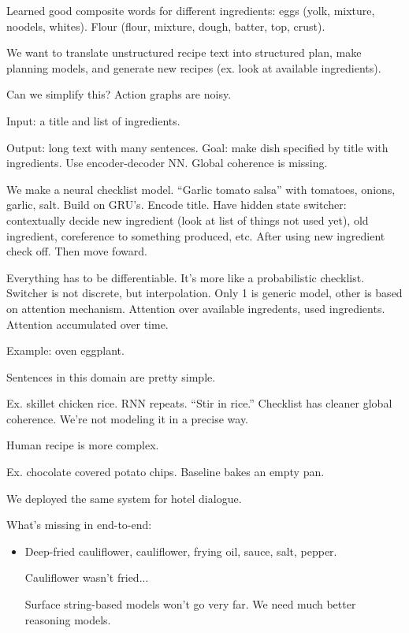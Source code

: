 Learned good composite words for different ingredients: eggs (yolk, mixture, noodels, whites). Flour (flour, mixture, dough, batter, top, crust). 

We want to translate unstructured recipe text into structured plan, make planning models, and generate new recipes (ex. look at available ingredients).

Can we simplify this? Action graphs are noisy.

Input: a title and list of ingredients.

Output: long text with many sentences. Goal: make dish specified by title with ingredients. Use encoder-decoder NN. 
Global coherence is missing.



We make a neural checklist model. ``Garlic tomato salsa'' with tomatoes, onions, garlic, salt. Build on GRU's. Encode title. Have hidden state switcher: contextually decide new ingredient (look at list of things not used yet), old ingredient, coreference to something produced, etc. After using new ingredient check off. Then move foward. 

Everything has to be differentiable. 
It's more like a probabilistic checklist.  Switcher is not discrete, but interpolation.
Only 1 is generic model, other is based on attention mechanism. Attention over available ingredents, used ingredients. Attention accumulated over time.

Example: oven eggplant.

Sentences in this domain are pretty simple.

Ex. skillet chicken rice. RNN repeats. ``Stir in rice.'' Checklist has cleaner global coherence. We're not modeling it in a precise way.

Human recipe is more complex.

Ex. chocolate covered potato chips. Baseline bakes an empty pan. 

We deployed the same system for hotel dialogue.

What's missing in end-to-end: 
\begin{itemize}
\item
Deep-fried cauliflower, cauliflower, frying oil, sauce, salt, pepper.

Cauliflower wasn't fried...

Surface string-based models won't go very far. We need much better reasoning models.
\end{itemize}

